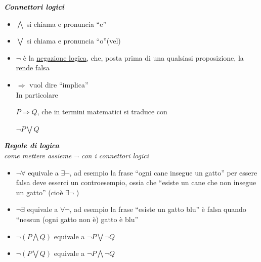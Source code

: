 \documentclass{article}
\theoremstyle{definition}
\newcommand{\virgolette}[1]{``#1''}
\begin{document}
\begin{itemize}
\begin{center}
    \textit{\textbf{Connettori logici}} \label{connettori}
    \end{center}
     \begin{itemize}
        \item $\bigwedge$ si chiama e pronuncia \virgolette{e}
        \item $\bigvee $ si chiama e pronuncia \virgolette{o}(vel) 
        \item $\neg$ è la \underline{negazione logica}, che, posta prima di una qualsiasi proposizione, la rende falsa
        \item $\Rightarrow$ vuol dire \virgolette{implica}
        \\In particolare\\
        \begin{center}
            $P \Rightarrow Q$, che in termini matematici si traduce con 
        \end{center}
        \begin{center}
            $\neg P \bigvee Q$
        \end{center}
    \end{itemize}

    \begin{center}
        \textbf{\textit{Regole di logica}}
        \\ \textit{come mettere assieme $\neg$ con i connettori logici }
        \begin{itemize}
            \item $\neg \forall$ equivale a $\exists \neg$, ad esempio la frase \virgolette{ogni cane insegue un gatto} per essere falsa deve esserci un controesempio, ossia che \virgolette{esiste un cane che non insegue un gatto} (cioè $\exists \neg \,\,$)
            \item $\neg \exists $ equivale a $\forall \neg$, ad esempio la frase \virgolette{esiste un gatto blu} è falsa quando \virgolette{nessun (ogni gatto non è) gatto è blu}
            \item $\neg(P \bigwedge Q)$ equivale a $\neg P \bigvee \neg Q$
            \item $\neg (P \bigvee Q)$ equivale a $\neg P \bigwedge \neg Q$
        \end{itemize}
    \end{center}


\end{itemize}
\end{document}
